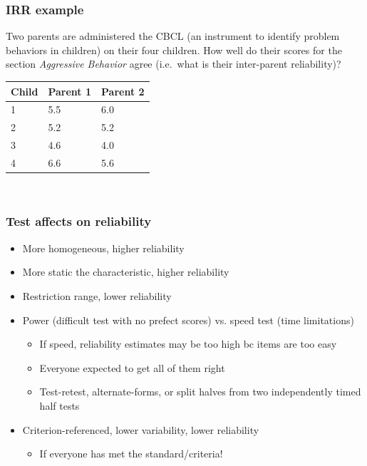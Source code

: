 \documentclass[dvipsnames]{beamer}\usepackage[]{graphicx}\usepackage[]{color}
\begin{document}
\begin{frame}
\frametitle{IRR example}

Two parents are administered the CBCL (an instrument to identify problem behaviors in children) on their four children. How well do their scores for the section \textit{Aggressive Behavior} agree (i.e.\ what is their inter-parent reliability)?

\begin{center}
\begin{tabular}{lll}
\hline
Child &	Parent 1 &	Parent 2 \\
\hline
1&	5.5	&6.0\\
2&	5.2	&5.2\\
3&	4.6&	4.0\\
4&	6.6&	5.6\\
\hline
\end{tabular}
\end{center}
\end{frame}

{
\begin{frame}
\centering\Huge \textcolor{white}{Make sure you understand Table 5-4!}
\end{frame}
}

\begin{frame}
\frametitle{Test affects on reliability}
\begin{itemize}
\item More homogeneous, higher reliability
\item More static the characteristic, higher reliability
\item Restriction range, lower reliability
\item Power (difficult test with no prefect scores) vs. speed test (time limitations)
  \begin{itemize}
  \item If speed, reliability estimates may be too high bc items are too easy
  \item Everyone expected to get all of them right
  \item Test-retest, alternate-forms, or split halves from two independently timed half tests
  \end{itemize}
\item Criterion-referenced, lower variability, lower reliability
  \begin{itemize}
    \item If everyone has met the standard/criteria!
  \end{itemize}
 \end{itemize}
\end{frame}
\end{document}
